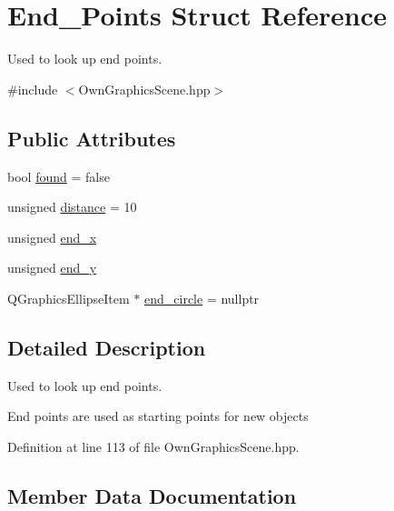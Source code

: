 \hypertarget{structEnd__Points}{}\section{End\+\_\+\+Points Struct Reference}
\label{structEnd__Points}


Used to look up end points.  




{\ttfamily \#include $<$Own\+Graphics\+Scene.\+hpp$>$}

\subsection*{Public Attributes}
\begin{DoxyCompactItemize}
\item 
bool \mbox{\hyperlink{structEnd__Points_aff9dd173210b07bb087d70cf5ec9439f}{found}} = false
\item 
unsigned \mbox{\hyperlink{structEnd__Points_a08442d5de0da7d680a5a0fba7df6cf3b}{distance}} = 10
\item 
unsigned \mbox{\hyperlink{structEnd__Points_a2b33a99792ec437e7c2369ceaf435176}{end\+\_\+x}}
\item 
unsigned \mbox{\hyperlink{structEnd__Points_a04207ee9a97ee6d785b493305cd9e7e8}{end\+\_\+y}}
\item 
Q\+Graphics\+Ellipse\+Item $\ast$ \mbox{\hyperlink{structEnd__Points_abf301947140c1584823b50071c7b8ee6}{end\+\_\+circle}} = nullptr
\end{DoxyCompactItemize}


\subsection{Detailed Description}
Used to look up end points. 

End points are used as starting points for new objects 

Definition at line 113 of file Own\+Graphics\+Scene.\+hpp.



\subsection{Member Data Documentation}
\mbox{\label{structEnd__Points_a08442d5de0da7d680a5a0fba7df6cf3b}} 
